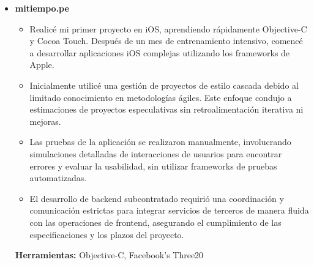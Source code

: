 \documentclass[11pt,a4paper,english]{moderncv}
\begin{document}
{\begin{itemize}
\begin{itemize}
            \item Me centré en extraer y documentar los requisitos del software, traduciéndolos en historias de usuario para el backlog del sprint, optimizando la gestión de proyectos y el desarrollo ágil.
            \item Como Arquitecto de Software y Gerente de Proyecto, tomé decisiones clave sobre los protocolos de comunicación de códecs y realicé pruebas de carga para asegurar alta calidad de audio y rendimiento.
            \item Gestioné y mentoré a cuatro Desarrolladores Junior en la integración de la marca corporativa en la aplicación, asegurando la alineación con la estrategia de marca y los estándares de identidad corporativa.
        \end{itemize}
        \textbf{Herramientas:} Objective-C, Three20, Linphone, C
    \item \textbf{mitiempo.pe}
        \begin{itemize}
            \item Realicé mi primer proyecto en iOS, aprendiendo rápidamente Objective-C y Cocoa Touch. Después de un mes de entrenamiento intensivo, comencé a desarrollar aplicaciones iOS complejas utilizando los frameworks de Apple.
            \item Inicialmente utilicé una gestión de proyectos de estilo cascada debido al limitado conocimiento en metodologías ágiles. Este enfoque condujo a estimaciones de proyectos especulativas sin retroalimentación iterativa ni mejoras.
            \item Las pruebas de la aplicación se realizaron manualmente, involucrando simulaciones detalladas de interacciones de usuarios para encontrar errores y evaluar la usabilidad, sin utilizar frameworks de pruebas automatizadas.
            \item El desarrollo de backend subcontratado requirió una coordinación y comunicación estrictas para integrar servicios de terceros de manera fluida con las operaciones de frontend, asegurando el cumplimiento de las especificaciones y los plazos del proyecto.
        \end{itemize}
        \textbf{Herramientas:} Objective-C, Facebook’s Three20
\end{itemize}
}

\subsection{}
\end{document}
